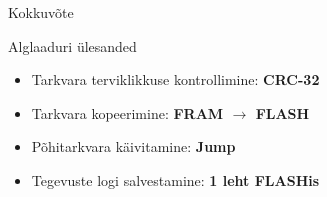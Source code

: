\documentclass[pdf]{beamer}
\begin{document}
\begin{frame}{Kokkuvõte}
	\begin{block}{Alglaaduri ülesanded}
		\begin{itemize}
			\item Tarkvara terviklikkuse kontrollimine: \textbf{CRC-32}
			\item Tarkvara kopeerimine: \textbf{FRAM \(\to\) FLASH}
			\item Põhitarkvara käivitamine: \textbf{Jump}
			\item Tegevuste logi salvestamine: \textbf{1 leht FLASHis}
		\end{itemize}
	\end{block}
\end{frame}
\end{document}
